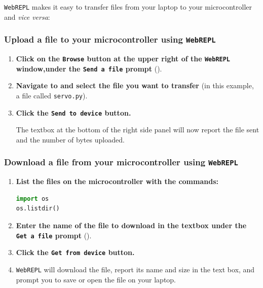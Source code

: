 \texttt{WebREPL} makes it easy to transfer files from your laptop to your microcontroller and \textit{vice versa}: 

\subsubsection{\howto Upload a file to your microcontroller using \texttt{WebREPL}}
\begin{enumerate}
	\item \textbf{Click on the \texttt{Browse} button at the upper right of the \texttt{WebREPL} window,under the \texttt{Send a file} prompt} (). 
	\item \textbf{Navigate to and select the file you want to transfer} (in this example, a file called \texttt{servo.py}).
	\item \textbf{Click the \texttt{Send to device} button.} 
	
	The textbox at the bottom of the right side panel will now report the file sent and the number of bytes uploaded.
\end{enumerate}


\subsubsection{\howto Download a file from your microcontroller using \texttt{WebREPL}}
\begin{enumerate}
	\item \textbf{List the files on the microcontroller with the \Micropython commands:}
\begin{lstlisting}[language=Python]
import os
os.listdir()
\end{lstlisting}
	
	\item \textbf{\textbf{Enter the name of the file to download in the textbox under the \texttt{Get a file} prompt}} ().
	
	
	\item \textbf{Click the \texttt{Get from device} button.} 
	\item \texttt{WebREPL} will download the file, report its name and size in the text box, and prompt you to save or open the file on your laptop.
	\end{enumerate}

